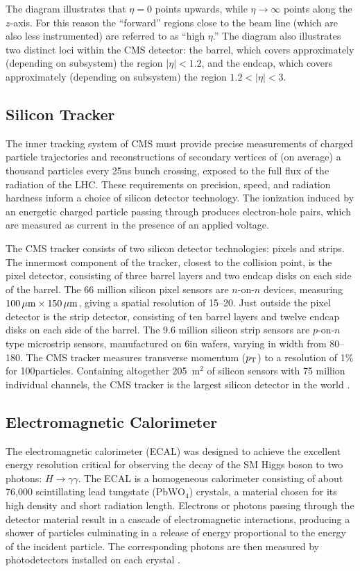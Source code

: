 The diagram illustrates that $\eta = 0$ points upwards, while $\eta \to \infty$ points along the $z$-axis.
For this reason the ``forward'' regions close to the beam line (which are also less instrumented) are referred to as ``high $\eta$.''
The diagram also illustrates two distinct loci within the CMS detector: the barrel, which covers approximately (depending on subsystem) the region $|\eta| < 1.2$, and the endcap, which covers approximately (depending on subsystem) the region $1.2 < |\eta| < 3$.

\subsection{Silicon Tracker}
The inner tracking system of CMS must provide precise measurements of charged particle trajectories and reconstructions of secondary vertices of (on average) a thousand particles every 25\unit{ns} bunch crossing, exposed to the full flux of the radiation of the LHC.
These requirements on precision, speed, and radiation hardness inform a choice of silicon detector technology.
The ionization induced by an energetic charged particle passing through produces electron-hole pairs, which are measured as current in the presence of an applied voltage.

The CMS tracker consists of two silicon detector technologies: pixels and strips.
The innermost component of the tracker, closest to the collision point, is the pixel detector, consisting of three barrel layers and two endcap disks on each side of the barrel.
The 66 million silicon pixel sensors are $n$-on-$n$ devices, measuring $100 \,\mu\text{m} \times 150 \,\mu\text{m}$, giving a spatial resolution of 15--20\mum.
Just outside the pixel detector is the strip detector, consisting of ten barrel layers and twelve endcap disks on each side of the barrel.
The 9.6 million silicon strip sensors are $p$-on-$n$ type microstrip sensors, manufactured on 6\unit{in} wafers, varying in width from 80--180\mum.
The CMS tracker measures transverse momentum ($p_{\mathrm{T}}$) to a resolution of 1\% for 100\GeV particles.
Containing altogether 205~$\text{m}^2$ of silicon sensors with 75 million individual channels, the CMS tracker is the largest silicon detector in the world \cite{Chatrchyan:2008zzk, CERN-LHCC-98-006, HARTMANN201225}.


\subsection{Electromagnetic Calorimeter}
The electromagnetic calorimeter (ECAL) was designed to achieve the excellent energy resolution critical for observing the decay of the SM Higgs boson to two photons: $H \to \gamma\gamma$.
The ECAL is a homogeneous calorimeter consisting of about 76,000 scintillating lead tungstate (PbWO$_4$) crystals, a material chosen for its high density and short radiation length.
Electrons or photons passing through the detector material result in a cascade of electromagnetic interactions, producing a shower of particles culminating in a release of energy proportional to the energy of the incident particle.
The corresponding photons are then measured by photodetectors installed on each crystal \cite{Chatrchyan:2008zzk, CERN-LHCC-97-033, Fabjan:692252}.

